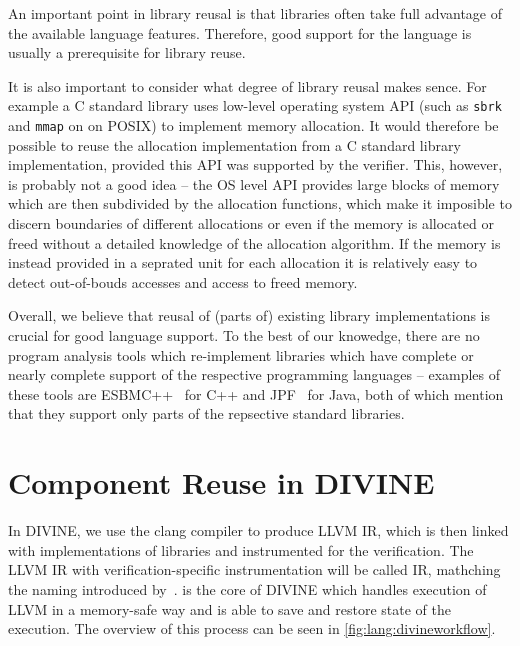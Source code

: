 An important point in library reusal is that libraries often take full advantage of the available language features.
Therefore, good support for the language is usually a prerequisite for library reuse.

It is also important to consider what degree of library reusal makes sence.
For example a C standard library uses low-level operating system API (such as
\texttt{sbrk} and \texttt{mmap} on on POSIX) to implement memory allocation.
It would therefore be possible to reuse the allocation implementation from a C
standard library implementation, provided this API was supported by the
verifier.
This, however, is probably not a good idea -- the OS level API provides large
blocks of memory which are then subdivided by the allocation functions, which
make it imposible to discern boundaries of different allocations or even if the
memory is allocated or freed without a detailed knowledge of the allocation
algorithm.
If the memory is instead provided in a seprated unit for each allocation it is
relatively easy to detect out-of-bouds accesses and access to freed memory.

Overall, we believe that reusal of (parts of) existing library implementations is crucial for good language support.
To the best of our knowedge, there are no program analysis tools which
re-implement libraries which have complete or nearly complete support of the
respective programming languages -- examples of these tools are
ESBMC++~ for C++ and JPF~ for Java, both of
which mention that they support only parts of the repsective standard
libraries.

\section{Component Reuse in DIVINE}\label{sec:lang:divine}

In DIVINE, we use the clang compiler to produce LLVM IR, which is then linked
with implementations of libraries and instrumented for the verification.
The LLVM IR with verification-specific instrumentation will be called \divm IR,
mathching the naming introduced by~.
\divm is the core of DIVINE which handles execution of LLVM in a memory-safe
way and is able to save and restore state of the execution.
The overview of this process can be seen in \autoref{fig:lang:divineworkflow}.

